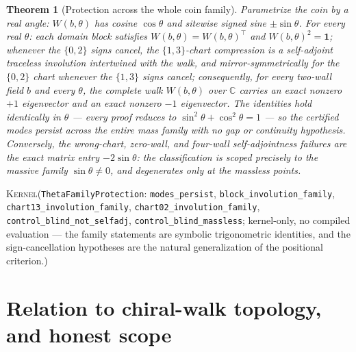 \documentclass[11pt]{article}
\newcommand{\id}{\mathbf{1}}
\newcommand{\C}{\mathbb{C}}
\newcommand{\Kernel}{\textcolor{kernelcolor}{\textsc{Kernel}}}
\newtheorem{theorem}{Theorem}
\begin{document}
\begin{theorem}[Protection across the whole coin family]\label{thm:theta}
Parametrize the coin by a real angle: $W(b,\theta)$ has cosine
$\cos\theta$ and sitewise signed sine $\pm\sin\theta$.  For every real
$\theta$: each domain block satisfies $W(b,\theta)=W(b,\theta)^{\!\top}$
and $W(b,\theta)^2=\id$; whenever the $\{0,2\}$ signs cancel, the
$\{1,3\}$-chart compression is a self-adjoint traceless involution
intertwined with the walk, and mirror-symmetrically for the
$\{0,2\}$ chart whenever the $\{1,3\}$ signs cancel; consequently, for
every two-wall field $b$ and every $\theta$, the complete walk
$W(b,\theta)$ over $\C$ carries an exact nonzero $+1$ eigenvector and an
exact nonzero $-1$ eigenvector.  The identities hold identically in
$\theta$ --- every proof reduces to $\sin^2\theta+\cos^2\theta=1$ --- so
the certified modes persist across the entire mass family with no gap or
continuity hypothesis.  Conversely, the wrong-chart, zero-wall, and
four-wall self-adjointness failures are the exact matrix entry
$-2\sin\theta$: the classification is scoped precisely to the massive
family $\sin\theta\neq0$, and degenerates only at the massless points.
\end{theorem}
\noindent\Kernel{}\quad(\texttt{ThetaFamilyProtection}:
\texttt{modes\_persist}, \texttt{block\_involution\_family},
\texttt{chart13\_involution\_family}, \texttt{chart02\_involution\_family},
\texttt{control\_blind\_not\_selfadj}, \texttt{control\_blind\_massless};
kernel-only, no compiled evaluation --- the family statements are
symbolic trigonometric identities, and the sign-cancellation hypotheses
are the natural generalization of the positional criterion.)

\section{Relation to chiral-walk topology, and honest scope}
\end{document}
